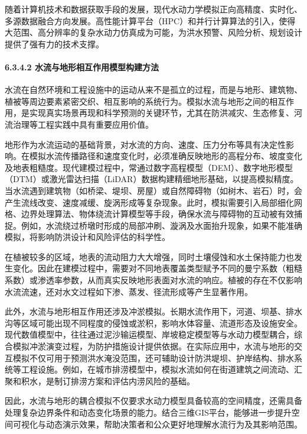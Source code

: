 随着计算机技术和数据获取手段的发展，现代水动力学模拟正向高精度、实时化、多源数据融合方向发展。高性能计算平台（HPC）和并行计算算法的引入，使得大范围、高分辨率的复杂水动力仿真成为可能，为洪水预警、风险分析、规划设计提供了强有力的技术支撑。

\paragraph{6.3.4.2 水流与地形相互作用模型构建方法}\label{ux6c34ux6d41ux4e0eux5730ux5f62ux76f8ux4e92ux4f5cux7528ux6a21ux578bux6784ux5efaux65b9ux6cd5}

水流在自然环境和工程设施中的运动从来不是孤立的过程，而是与地形、建筑物、植被等周边要素紧密交织、相互影响的系统行为。模拟水流与地形之间的相互作用，是实现真实场景再现和科学预测的关键环节，尤其在防洪减灾、生态修复、河流治理等工程实践中具有重要应用价值。

地形作为水流运动的基础背景，对水流的方向、速度、压力分布等具有决定性影响。在模拟水流传播路径和速度变化时，必须准确反映地形的高程分布、坡度变化及地表粗糙度。现代建模过程中，常通过数字高程模型（DEM）、数字地形模型（DTM）或激光雷达扫描（LiDAR）数据构建精细地形基础，以提高模拟精度。当水流遇到建筑物（如桥梁、堤坝、房屋）或自然障碍物（如树木、岩石）时，会产生流线改变、速度减缓、旋涡形成等复杂现象。此时，模拟需要引入局部细化网格、边界处理算法、物体绕流计算模型等手段，确保水流与障碍物的互动被有效捕捉。例如，水流绕过桥墩时形成的局部冲刷、漩涡及水面抬升现象，如果不能准确模拟，将影响防洪设计和风险评估的科学性。

在植被较多的区域，地表的流动阻力大大增强，同时土壤侵蚀和水土保持能力也发生变化。因此在建模过程中，需要对不同地表覆盖类型赋予不同的曼宁系数（粗糙系数）或渗透率参数，从而真实反映地形表面对水流的响应。植被的存在不仅影响水流流速，还对水文过程如下渗、蒸发、径流形成等产生显著作用。

此外，水流与地形相互作用还涉及冲淤模拟。长期水流作用下，河道、坝基、排水沟等区域可能出现不同程度的侵蚀或淤积，影响水体容量、流道形态及设施安全。现代数值模型中，往往通过泥沙输运模型、岸坡稳定模型等与水动力模型耦合，综合模拟冲淤演变过程，为防护措施设计提供依据。在实际应用中，水流与地形的交互模拟不仅可用于预测洪水淹没范围，还可辅助设计防洪堤坝、护岸结构、排水系统等工程设施。例如，在城市排涝模型中，模拟水流如何在街道建筑之间流动、汇聚和积水，是制订排涝方案和评估内涝风险的基础。

因此，水流与地形的耦合模拟不仅要求水动力模型具备较高的空间精度，还需具备处理复杂边界条件和动态变化场景的能力。结合三维GIS平台，能够进一步提升空间可视化与动态演示效果，帮助决策者和公众更好地理解水流行为及其影响范围。

